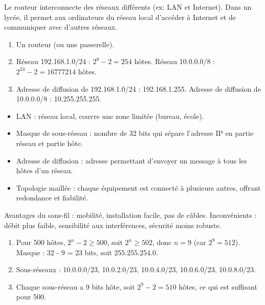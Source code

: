 Le routeur interconnecte des réseaux différents (ex: LAN et Internet). Dans un lycée, il permet aux ordinateurs du réseau local d'accéder à Internet et de communiquer avec d'autres réseaux.

\begin{enumerate}
    \item Un routeur (ou une passerelle).
    \item Réseau 192.168.1.0/24 : $2^8 - 2 = 254$ hôtes. Réseau 10.0.0.0/8 : $2^{24} - 2 = 16 777 214$ hôtes.
    \item Adresse de diffusion de 192.168.1.0/24 : 192.168.1.255. Adresse de diffusion de 10.0.0.0/8 : 10.255.255.255.
\end{enumerate}

\begin{itemize}
    \item LAN : réseau local, couvre une zone limitée (bureau, école).
    \item Masque de sous-réseau : nombre de 32 bits qui sépare l'adresse IP en partie réseau et partie hôte.
    \item Adresse de diffusion : adresse permettant d'envoyer un message à tous les hôtes d'un réseau.
    \item Topologie maillée : chaque équipement est connecté à plusieurs autres, offrant redondance et fiabilité.
\end{itemize}

Avantages du sans-fil : mobilité, installation facile, pas de câbles. Inconvénients : débit plus faible, sensibilité aux interférences, sécurité moins robuste.

\begin{enumerate}
    \item Pour 500 hôtes, $2^n - 2 \geq 500$, soit $2^n \geq 502$, donc $n = 9$ (car $2^9 = 512$). Masque : 32 - 9 = 23 bits, soit 255.255.254.0.
    \item Sous-réseaux : 10.0.0.0/23, 10.0.2.0/23, 10.0.4.0/23, 10.0.6.0/23, 10.0.8.0/23.
    \item Chaque sous-réseau a 9 bits hôte, soit $2^9 - 2 = 510$ hôtes, ce qui est suffisant pour 500.
\end{enumerate}